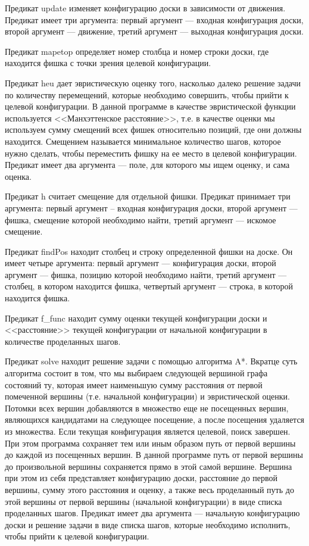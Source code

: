 \documentclass{article}
\begin{document}
Предикат update изменяет конфигурацию доски в зависимости от
движения. Предикат имеет три аргумента: первый аргумент --- входная
конфигурация доски, второй аргумент --- движение, третий аргумент ---
выходная конфигурация доски.

Предикат mapetop определяет номер столбца и номер строки доски, где
находится фишка с точки зрения целевой конфигурации.

Предикат heu дает эвристическую оценку того, насколько далеко решение
задачи по количеству перемещений, которые необходимо совершить, чтобы
прийти к целевой конфигурации. В данной программе в качестве
эвристической функции используется <<Манхэттенское расстояние>>,
т.е. в качестве оценки мы используем сумму смещений всех фишек
относительно позиций, где они должны находится. Смещением называется
минимальное количество шагов, которое нужно сделать, чтобы переместить
фишку на ее место в целевой конфигурации. Предикат имеет два аргумента
--- поле, для которого мы ищем оценку, и сама оценка.

Предикат h считает смещение для отдельной фишки. Предикат принимает
три аргумента: первый аргумент -- входная конфигурация доски, второй
аргумент --- фишка, смещение которой необходимо найти, третий аргумент
--- искомое смещение.

Предикат findPos находит столбец и строку определенной фишки на
доске. Он имеет четыре аргумента: первый аргумент --- конфигурация
доски, второй аргумент --- фишка, позицию которой необходимо найти,
третий аргумент --- столбец, в котором находится фишка, четвертый
аргумент --- строка, в которой находится фишка.

Предикат f\_func находит сумму оценки текущей конфигурации доски и
<<расстояние>> текущей конфигурации от начальной конфигурации в
количестве проделанных шагов.

Предикат solve находит решение задачи с помощью алгоритма A*. Вкратце
суть алгоритма состоит в том, что мы выбираем следующей вершиной графа
состояний ту, которая имеет наименьшую сумму расстояния от первой
помеченной вершины (т.е. начальной конфигурации) и эвристической
оценки. Потомки всех вершин добавляются в множество еще не посещенных
вершин, являющихся кандидатами на следующее посещение, а после
посещения удаляется из множества. Если текущая конфигурация является
целевой, поиск завершен. При этом программа сохраняет тем или иным
образом путь от первой вершины до каждой из посещенных вершин. В
данной программе путь от первой вершины до произвольной вершины
сохраняется прямо в этой самой вершине. Вершина при этом из себя
представляет конфигурацию доски, расстояние до первой вершины, сумму
этого расстояния и оценку, а также весь проделанный путь до этой
вершины от первой вершины (начальной конфигурации) в виде списка
проделанных шагов. Предикат имеет два аргумента --- начальную
конфигурацию доски и решение задачи в виде списка шагов, которые
необходимо исполнить, чтобы прийти к целевой конфигурации.
\end{document}
